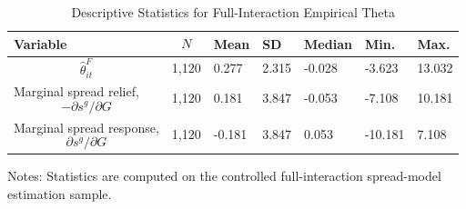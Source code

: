 \begin{table}[H]\centering
\begin{threeparttable}
\caption{Descriptive Statistics for Full-Interaction Empirical Theta}
\label{tab:theta_descriptive_stats}
\scriptsize
\begin{tabularx}{\textwidth}{lYYYYYY}
\toprule
Variable & $$N$$ & Mean & SD & Median & Min. & Max. \\
\midrule
$$\widehat{\theta}^{F}_{it}$$ & 1,120 & 0.277 & 2.315 & -0.028 & -3.623 & 13.032 \\
Marginal spread relief, $$-\partial s^g/\partial G$$ & 1,120 & 0.181 & 3.847 & -0.053 & -7.108 & 10.181 \\
Marginal spread response, $$\partial s^g/\partial G$$ & 1,120 & -0.181 & 3.847 & 0.053 & -10.181 & 7.108 \\
\bottomrule
\end{tabularx}
\begin{tablenotes}[flushleft]\footnotesize
\item Notes: Statistics are computed on the controlled full-interaction spread-model estimation sample.
\end{tablenotes}
\end{threeparttable}
\end{table}
